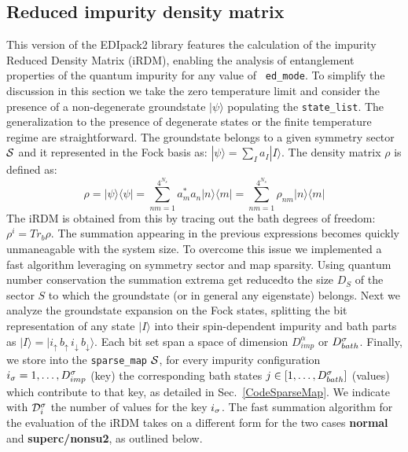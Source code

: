 \documentclass[preprint,3p,10pt]{elsarticle}
\newcommand{\secu}[1]
{Sec.~\ref{#1}}
\newcommand{\ket}[1]
{|#1\rangle}
\newcommand{\bra}[1]
{\langle #1|}
\def\a{\alpha}       \def\b{\beta}   \def\g{\gamma}   \def\d{\delta}
\def\NAME{{\rm EDIpack2 }}
\begin{document}
\subsection{Reduced impurity density matrix}\label{sSecRDM}
This version of the \NAME library features the calculation of the
impurity Reduced Density Matrix (iRDM), enabling the analysis of
entanglement properties of the quantum impurity for any value of {\tt
  ed\_mode}.
To simplify the discussion in this section we take the zero
temperature limit and consider the presence of a non-degenerate
groundstate $\ket{\psi}$ populating the {\tt state\_list}.
The generalization to the presence of degenerate states or the finite
temperature regime are straightforward.
The groundstate belongs to a given symmetry sector ${\cal S}$ and it
represented in the Fock basis as:  $\ket{\psi} = \sum_I a_I \ket{I}$. 
The density matrix $\rho$ is defined as:
$$
\rho = \ket{\psi}\bra{\psi} = \sum_{nm=1}^{4^{N_s}} a^*_ma_n \ket{n}\bra{m} =\sum_{nm=1}^{4^{N_s}} \rho_{nm} \ket{n}\bra{m} 
$$
The iRDM is obtained from this by tracing out the bath degrees of
freedom: $\rho^{i}=Tr_{b}\rho$. The summation appearing in the
previous expressions becomes quickly unmaneagable with the system
size. To overcome this issue we implemented a fast algorithm
leveraging on symmetry sector and map sparsity.
Using quantum number conservation the summation extrema get reducedto
the size $D_S$ of the sector $S$ to which the groundstate (or in
general any eigenstate) belongs. 
Next we analyze the groundstate expansion on the Fock states, splitting the bit representation of any state $\ket{I}$ into
their spin-dependent impurity and bath parts as $\ket{I} = \ket{
  i_\uparrow\,  b_\uparrow\, i_\downarrow \, b_\downarrow}$. Each bit
set span a space of dimension $D^\a_{imp}$ or $D^\sigma_{bath}$. 
Finally, we store into the {\tt sparse\_map} ${\cal S}$, for every impurity configuration 
$i_\sigma =1,\dots,D^\sigma_{imp}$ (key) the corresponding bath states $j\in[1,\dots,D^\sigma_{bath}]$
(values) which contribute to that key, as detailed in
\secu{CodeSparseMap}.
We indicate with ${\cal D}^\sigma_{i}$ the number of values for the key $i_\sigma$.
The fast summation algorithm for the evaluation of the iRDM takes on a
different form for the two cases {\bf normal} and {\bf superc/nonsu2},
as outlined below.
\end{document}
